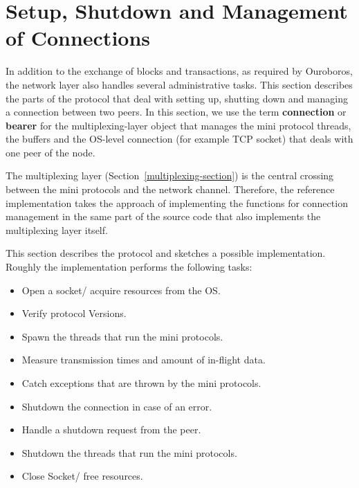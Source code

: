 \documentclass{report}
\newcommand{\state}[1]{\texttt{#1}}
\theoremstyle{definition}{
  \newtheorem{lemma}{Lemma}[section] %
  \newtheorem{definition}[lemma]{Definition}
}
\theoremstyle{theorem}{
  \newtheorem{invariant}[lemma]{Invariant}
  \newtheorem{proofobligation}[lemma]{Proof Obligation}
}
\numberwithin{equation}{lemma}
\begin{document}
\section{Setup, Shutdown and Management of Connections}
\label{peer-setup-section}
In addition to the exchange of blocks and transactions, as required by Ouroboros,
the network layer also handles several administrative tasks.
This section describes the parts of the protocol that deal with setting up, shutting down and
managing a connection between two peers.
In this section, we use the term {\bf connection} or {\bf bearer} for the multiplexing-layer object
that manages the mini protocol threads, the buffers and the OS-level connection
(for example TCP socket) that deals with one peer of the node.

The multiplexing layer (Section~\ref{multiplexing-section}) is the central crossing between
the mini protocols and the network channel.
Therefore, the reference implementation takes the approach
of implementing the functions for connection management in the same part of the source code
that also implements the multiplexing layer itself.

This section describes the protocol and sketches a possible implementation.
Roughly the implementation performs the following tasks:
\begin{itemize}
\item Open a socket/ acquire resources from the OS.
\item Verify protocol Versions.
\item Spawn the threads that run the mini protocols.
\item Measure transmission times and amount of in-flight data.
\item Catch exceptions that are thrown by the mini protocols.
\item Shutdown the connection in case of an error.
\item Handle a shutdown request from the peer.
\item Shutdown the threads that run the mini protocols.
\item Close Socket/ free resources.
\end{itemize}

\newcommand{\Larval}{\state{Larval}}
\newcommand{\Connected}{\state{Connected}}
\newcommand{\Mature}{\state{Mature}}
\newcommand{\Dying}{\state{Dying}}
\newcommand{\Dead}{\state{Dead}}
\end{document}
